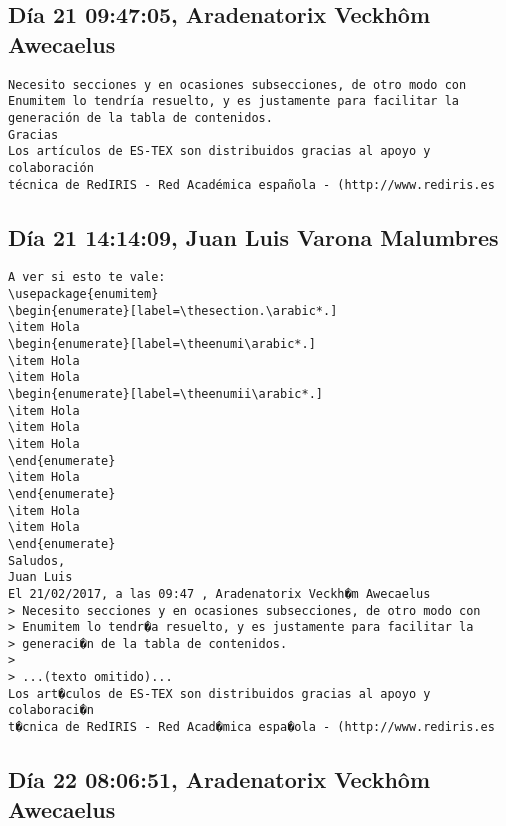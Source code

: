 \documentclass[a4paper,10pt]{article}
\begin{document}
\subsection{Día 21 09:47:05, Aradenatorix Veckhôm Awecaelus}

\begin{lstlisting}
Necesito secciones y en ocasiones subsecciones, de otro modo con
Enumitem lo tendría resuelto, y es justamente para facilitar la
generación de la tabla de contenidos.
Gracias
Los artículos de ES-TEX son distribuidos gracias al apoyo y colaboración 
técnica de RedIRIS - Red Académica española - (http://www.rediris.es

\end{lstlisting}

\subsection{Día 21 14:14:09, Juan Luis Varona Malumbres}

\begin{lstlisting}
A ver si esto te vale:
\usepackage{enumitem}
\begin{enumerate}[label=\thesection.\arabic*.]
\item Hola
\begin{enumerate}[label=\theenumi\arabic*.]
\item Hola
\item Hola
\begin{enumerate}[label=\theenumii\arabic*.]
\item Hola
\item Hola
\item Hola
\end{enumerate}
\item Hola
\end{enumerate}
\item Hola
\item Hola
\end{enumerate}
Saludos,
Juan Luis
El 21/02/2017, a las 09:47 , Aradenatorix Veckh�m Awecaelus 
> Necesito secciones y en ocasiones subsecciones, de otro modo con
> Enumitem lo tendr�a resuelto, y es justamente para facilitar la
> generaci�n de la tabla de contenidos.
> 
> ...(texto omitido)...
Los art�culos de ES-TEX son distribuidos gracias al apoyo y colaboraci�n 
t�cnica de RedIRIS - Red Acad�mica espa�ola - (http://www.rediris.es

\end{lstlisting}

\subsection{Día 22 08:06:51, Aradenatorix Veckhôm Awecaelus}
\end{document}
